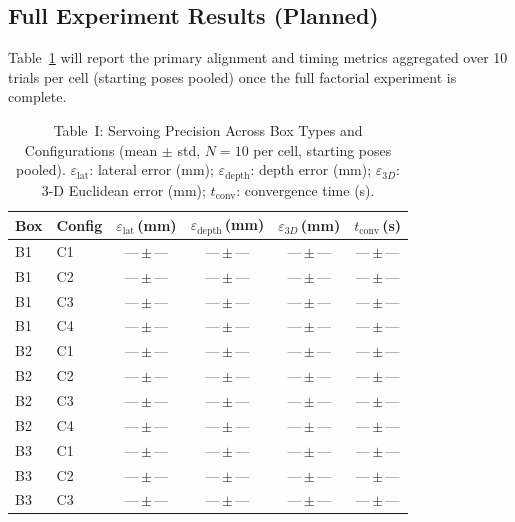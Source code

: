 \documentclass[lettersize,journal]{IEEEtran}
\begin{document}
\subsection{Full Experiment Results (Planned)}
\label{sec:results_full}

Table~\ref{tab:main_results} will report the primary alignment and timing
metrics aggregated over 10 trials per cell (starting poses pooled) once the
full factorial experiment is complete.

\begin{table}[t]
  \centering
  \caption{Table~I: Servoing Precision Across Box Types and Configurations
           (mean $\pm$ std, $N=10$ per cell, starting poses pooled).
           $\varepsilon_{\text{lat}}$: lateral error (mm);
           $\varepsilon_{\text{depth}}$: depth error (mm);
           $\varepsilon_{3D}$: 3-D Euclidean error (mm);
           $t_{\text{conv}}$: convergence time (s).}
  \label{tab:main_results}
  \begin{tabular}{@{}llcccc@{}}
    \toprule
    Box & Config
      & $\varepsilon_{\text{lat}}$\,(mm)
      & $\varepsilon_{\text{depth}}$\,(mm)
      & $\varepsilon_{3D}$\,(mm)
      & $t_{\text{conv}}$\,(s) \\
    \midrule
    B1 & C1 & ---\,$\pm$\,--- & ---\,$\pm$\,--- & ---\,$\pm$\,--- & ---\,$\pm$\,--- \\
    B1 & C2 & ---\,$\pm$\,--- & ---\,$\pm$\,--- & ---\,$\pm$\,--- & ---\,$\pm$\,--- \\
    B1 & C3 & ---\,$\pm$\,--- & ---\,$\pm$\,--- & ---\,$\pm$\,--- & ---\,$\pm$\,--- \\
    B1 & C4 & ---\,$\pm$\,--- & ---\,$\pm$\,--- & ---\,$\pm$\,--- & ---\,$\pm$\,--- \\
    B2 & C1 & ---\,$\pm$\,--- & ---\,$\pm$\,--- & ---\,$\pm$\,--- & ---\,$\pm$\,--- \\
    B2 & C2 & ---\,$\pm$\,--- & ---\,$\pm$\,--- & ---\,$\pm$\,--- & ---\,$\pm$\,--- \\
    B2 & C3 & ---\,$\pm$\,--- & ---\,$\pm$\,--- & ---\,$\pm$\,--- & ---\,$\pm$\,--- \\
    B2 & C4 & ---\,$\pm$\,--- & ---\,$\pm$\,--- & ---\,$\pm$\,--- & ---\,$\pm$\,--- \\
    B3 & C1 & ---\,$\pm$\,--- & ---\,$\pm$\,--- & ---\,$\pm$\,--- & ---\,$\pm$\,--- \\
    B3 & C2 & ---\,$\pm$\,--- & ---\,$\pm$\,--- & ---\,$\pm$\,--- & ---\,$\pm$\,--- \\
    B3 & C3 & ---\,$\pm$\,--- & ---\,$\pm$\,--- & ---\,$\pm$\,--- & ---\,$\pm$\,--- \\

\end{tabular}
\end{table}
\end{document}
